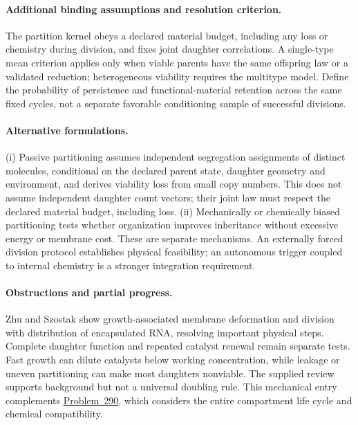 \documentclass[11pt]{article}
\begin{document}
\paragraph{Additional binding assumptions and resolution criterion.} The partition kernel obeys a declared material budget, including any loss or chemistry during division, and fixes joint daughter correlations. A single-type mean criterion applies only when viable parents have the same offspring law or a validated reduction; heterogeneous viability requires the multitype model. Define the probability of persistence and functional-material retention across the same fixed cycles, not a separate favorable conditioning sample of successful divisions.

\paragraph{Alternative formulations.} (i) Passive partitioning assumes independent segregation assignments of distinct molecules, conditional on the declared parent state, daughter geometry and environment, and derives viability loss from small copy numbers. This does not assume independent daughter count vectors; their joint law must respect the declared material budget, including loss. (ii) Mechanically or chemically biased partitioning tests whether organization improves inheritance without excessive energy or membrane cost. These are separate mechanisms. An externally forced division protocol establishes physical feasibility; an autonomous trigger coupled to internal chemistry is a stronger integration requirement.

\paragraph{Obstructions and partial progress.} Zhu and Szostak show growth-associated membrane deformation and division with distribution of encapsulated RNA, resolving important physical steps. Complete daughter function and repeated catalyst renewal remain separate tests. Fast growth can dilute catalysts below working concentration, while leakage or uneven partitioning can make most daughters nonviable. The supplied review supports background but not a universal doubling rule. This mechanical entry complements \href{https://we-solve.github.io/problems/origin-of-cellular-compartmentalisation-8ceea961/}{Problem~290}, which considers the entire compartment life cycle and chemical compatibility.
\end{document}
